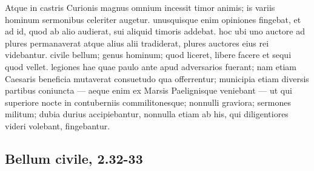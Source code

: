 Atque in castris Curionis magnus omnium incessit timor animis; is variis hominum sermonibus celeriter augetur. unusquisque enim opiniones fingebat, et ad id, quod ab alio audierat, sui aliquid timoris addebat. hoc ubi uno auctore ad plures permanaverat atque alius alii tradiderat, plures auctores eius rei videbantur. civile bellum; genus hominum; quod liceret, libere facere et sequi quod vellet. legiones hae quae paulo ante apud adversarios fuerant; nam etiam Caesaris beneficia mutaverat consuetudo qua offerrentur; municipia etiam diversis partibus coniuncta — aeque enim ex Marsis Paelignisque veniebant — ut qui superiore nocte in contuberniis commilitonesque; nonnulli graviora; sermones militum; dubia durius accipiebantur, nonnulla etiam ab his, qui diligentiores videri volebant, fingebantur.

\subsection*{Bellum civile, 2.32-33}

